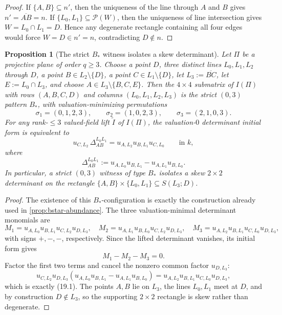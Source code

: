 \documentclass[11pt]{amsart}
\numberwithin{equation}{section}
\theoremstyle{plain}
\newtheorem{proposition}[theorem]{Proposition}
\theoremstyle{definition}
\theoremstyle{remark}
\begin{document}
\begin{proof}
If $\{A,B\}\subseteq n'$, then the uniqueness of the line through $A$ and $B$ gives $n'=\overline{AB}=n$. If
$\{L_0,L_1\}\subseteq \mathcal P(W)$, then the uniqueness of line intersection gives $W=L_0\cap L_1=D$. Hence any degenerate
rectangle containing all four edges would force $W=D\in n'=n$, contradicting $D\notin n$.
\end{proof}

\begin{proposition}[The strict $B_*$ witness isolates a skew determinant]
\label{prop:bstar-isolates-skew-delta}
Let $\Pi$ be a projective plane of order $q\ge 3$. Choose a point $D$, three distinct lines $L_0,L_1,L_2$ through $D$, a point
$B\in L_2\setminus\{D\}$, a point $C\in L_1\setminus\{D\}$, let $L_3:=\overline{BC}$, let $E:=L_0\cap L_3$, and choose
$A\in L_3\setminus\{B,C,E\}$. Then the $4\times4$ submatrix of $I(\Pi)$ with rows $(A,B,C,D)$ and columns $(L_0,L_1,L_2,L_3)$ is the
strict $(0,3)$ pattern $B_*$, with valuation-minimizing permutations
\[
\sigma_1=(0,1,2,3),\qquad \sigma_2=(1,0,2,3),\qquad \sigma_3=(2,1,0,3).
\]
For any rank-$\le 3$ valued-field lift $\widetilde I$ of $I(\Pi)$, the valuation-$0$ determinant initial form is equivalent to
\[
u_{C,L_2}\,\Delta_{AB}^{L_0L_1}=u_{A,L_2}u_{B,L_1}u_{C,L_0}
\qquad\text{in }k,
\tag{19.1}
\]
where
\[
\Delta_{AB}^{L_0L_1}:=u_{A,L_0}u_{B,L_1}-u_{A,L_1}u_{B,L_0}.
\tag{19.2}
\]
In particular, a strict $(0,3)$ witness of type $B_*$ isolates a \emph{skew} $2\times2$ determinant on the rectangle
$\{A,B\}\times\{L_0,L_1\}\subseteq S(L_3;D)$.
\end{proposition}

\begin{proof}
The existence of this $B_*$-configuration is exactly the construction already used in \cref{prop:bstar-abundance}. The three
valuation-minimal determinant monomials are
\[
M_1=u_{A,L_0}u_{B,L_1}u_{C,L_2}u_{D,L_3},
\quad
M_2=u_{A,L_1}u_{B,L_0}u_{C,L_2}u_{D,L_3},
\quad
M_3=u_{A,L_2}u_{B,L_1}u_{C,L_0}u_{D,L_3},
\]
with signs $+,-,-$, respectively. Since the lifted determinant vanishes, its initial form gives
\[
M_1-M_2-M_3=0.
\]
Factor the first two terms and cancel the nonzero common factor $u_{D,L_3}$:
\[
u_{C,L_2}u_{D,L_3}(u_{A,L_0}u_{B,L_1}-u_{A,L_1}u_{B,L_0})
=u_{A,L_2}u_{B,L_1}u_{C,L_0}u_{D,L_3},
\]
which is exactly \textup{(19.1)}. The points $A,B$ lie on $L_3$, the lines $L_0,L_1$ meet at $D$, and by construction $D\notin L_3$,
so the supporting $2\times2$ rectangle is skew rather than degenerate.
\end{proof}
\end{document}
